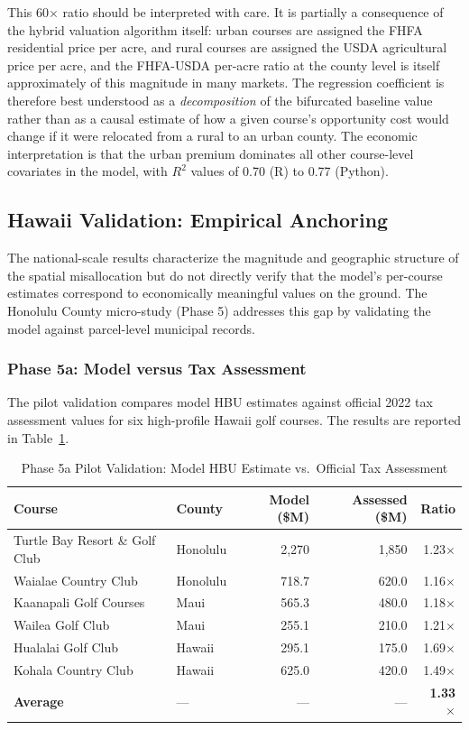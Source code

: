 \documentclass[11pt, letterpaper]{article}
\begin{document}
This 60$\times$ ratio should be interpreted with care. It is partially a consequence of the hybrid valuation algorithm itself: urban courses are assigned the FHFA residential price per acre, and rural courses are assigned the USDA agricultural price per acre, and the FHFA-USDA per-acre ratio at the county level is itself approximately of this magnitude in many markets. The regression coefficient is therefore best understood as a \textit{decomposition} of the bifurcated baseline value rather than as a causal estimate of how a given course's opportunity cost would change if it were relocated from a rural to an urban county. The economic interpretation is that the urban premium dominates all other course-level covariates in the model, with $R^2$ values of 0.70 (R) to 0.77 (Python).

\subsection{Hawaii Validation: Empirical Anchoring}

The national-scale results characterize the magnitude and geographic structure of the spatial misallocation but do not directly verify that the model's per-course estimates correspond to economically meaningful values on the ground. The Honolulu County micro-study (Phase 5) addresses this gap by validating the model against parcel-level municipal records.

\subsubsection{Phase 5a: Model versus Tax Assessment}

The pilot validation compares model HBU estimates against official 2022 tax assessment values for six high-profile Hawaii golf courses. The results are reported in Table~\ref{tab:hawaii_validation}.

\begin{table}[H]
\centering
\caption{Phase 5a Pilot Validation: Model HBU Estimate vs.\ Official Tax Assessment}
\label{tab:hawaii_validation}
\renewcommand{\arraystretch}{1.2}
\begin{tabular}{l l r r r}
\toprule
\textbf{Course} & \textbf{County} & \textbf{Model (\$M)} & \textbf{Assessed (\$M)} & \textbf{Ratio} \\
\midrule
Turtle Bay Resort \& Golf Club & Honolulu & 2{,}270 & 1{,}850 & 1.23$\times$ \\
Waialae Country Club & Honolulu & 718.7 & 620.0 & 1.16$\times$ \\
Kaanapali Golf Courses & Maui & 565.3 & 480.0 & 1.18$\times$ \\
Wailea Golf Club & Maui & 255.1 & 210.0 & 1.21$\times$ \\
Hualalai Golf Club & Hawaii & 295.1 & 175.0 & 1.69$\times$ \\
Kohala Country Club & Hawaii & 625.0 & 420.0 & 1.49$\times$ \\
\midrule
\textbf{Average} & --- & --- & --- & \textbf{1.33$\times$} \\
\bottomrule
\end{tabular}
\end{table}
\end{document}
